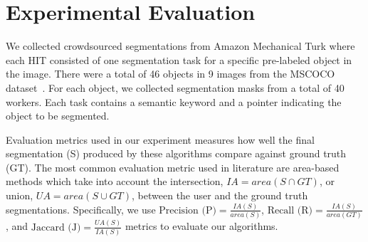 \section{Experimental Evaluation\label{sec:experiment}}

\par \noindent We collected crowdsourced segmentations from Amazon Mechanical Turk where each HIT consisted of one segmentation task for a specific pre-labeled object in the image. There were a total of 46 objects in 9 images from the MSCOCO dataset~\cite{Lin2014}. For each object, we collected segmentation masks from a total of 40 workers. Each task contains a semantic keyword and a pointer indicating the object to be segmented. %

\par \noindent Evaluation metrics used in our experiment measures how well the final segmentation (S) produced by these algorithms compare against ground truth (GT). The most common evaluation metric used in literature are area-based methods which take into account the intersection, $IA=area(S\cap GT)$, or union, $UA=area(S\cup GT)$, between the user and the ground truth segmentations. Specifically, we use
    $\text{Precision (P)} = \frac{IA(S)}{area(S)}$, 
    $\text{Recall (R)} = \frac{IA(S)}{area(GT)}$, and 
    $\text{Jaccard (J)} = \frac{UA(S)}{IA(S)}$
    metrics to evaluate our algorithms.

